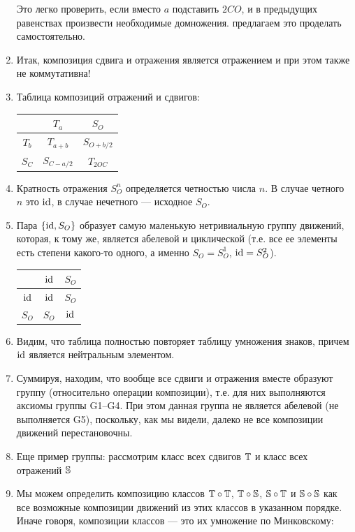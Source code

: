 \begin{enumerate}
Это легко проверить, если вместо $a$ подставить $2CO$, и в предыдущих равенствах произвести необходимые домножения. предлагаем это проделать самостоятельно.
\item Итак, композиция сдвига и отражения является отражением и при этом также не коммутативна!
\item Таблица композиций отражений и сдвигов:
\begin{center}
\begin{tabular}{c|c|c|}
  & $T_a$ & $S_O$ \\
 \hline
$T_b$ & $T_{a+b}$ & $S_{O+b/2}$ \\
 \hline
$S_C$ & $S_{C-a/2}$ & $T_{2OC}$ \\
\hline
\end{tabular}
\end{center}
\item Кратность отражения $S_O^n$ определяется четностью числа $n$. В случае четного $n$ это $\id$, в случае нечетного --- исходное $S_O$.
\item Пара $\{\id, S_O\}$ образует самую маленькую нетривиальную группу движений, которая, к тому же, является абелевой и циклической (т.е. все ее элементы есть степени какого-то одного, а именно $S_O=S_O^1$, $\id=S_O^2$).
\begin{table}[htb!]\begin{center}
\begin{tabular}{c|c|c|}
  & $\id$ & $S_O$ \\
 \hline
$\id$ & $\id$ & $S_O$ \\
 \hline
$S_O$ & $S_O$ & $\id$ \\
\hline
\end{tabular}
\end{center}\end{table}
\item Видим, что таблица полностью повторяет таблицу умножения знаков, причем $\id$ является нейтральным элементом.
\item Суммируя, находим, что вообще все сдвиги и отражения вместе образуют группу (относительно операции композиции), т.е. для них выполняются аксиомы группы G1--G4. При этом данная группа не является абелевой (не выполняется G5), поскольку, как мы видели, далеко не все композиции движений перестановочны.
\item Еще пример группы: рассмотрим класс всех сдвигов $\T$ и класс всех отражений $\S$
\item Мы можем определить композицию классов $\T\circ \T$, $\T\circ \S$, $\S\circ \T$ и $\S\circ \S$ как все возможные композиции движений из этих классов в указанном порядке. Иначе говоря, композиции классов --- это их умножение по Минковскому:

\end{enumerate}
